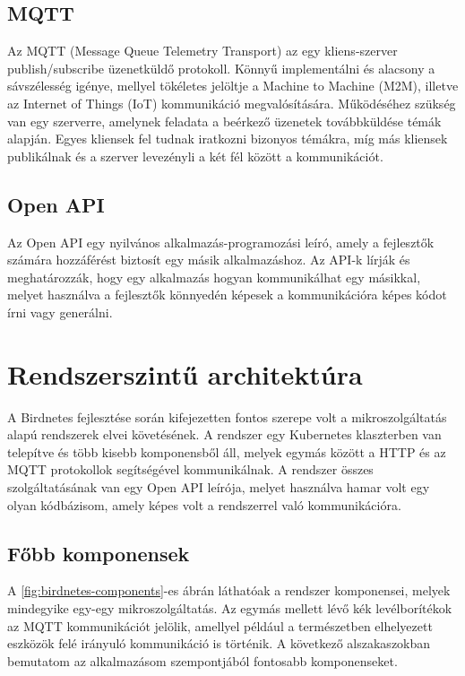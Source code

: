 \subsection{MQTT}
Az MQTT (Message Queue Telemetry Transport) az egy kliens-szerver publish/subscribe üzenetküldő protokoll. Könnyű implementálni és alacsony a sávszélesség igénye,
mellyel tökéletes jelöltje a Machine to Machine (M2M), illetve az Internet of Things (IoT) kommunikáció megvalósítására.
Működéséhez szükség van egy szerverre, amelynek feladata a beérkező üzenetek továbbküldése témák alapján. Egyes kliensek fel tudnak iratkozni bizonyos témákra, míg más kliensek publikálnak
és a szerver levezényli a két fél között a kommunikációt.

\subsection{Open API}
Az Open API egy nyilvános alkalmazás-programozási leíró, amely a fejlesztők számára hozzáférést biztosít egy másik alkalmazáshoz.
Az API-k lírják és meghatározzák, hogy egy alkalmazás hogyan kommunikálhat egy másikkal, 
melyet használva a fejlesztők könnyedén képesek a kommunikációra képes kódot írni vagy generálni.

\section{Rendszerszintű architektúra}
A Birdnetes fejlesztése során kifejezetten fontos szerepe volt a mikroszolgáltatás alapú rendszerek elvei követésének.
A rendszer egy Kubernetes klaszterben van telepítve és több kisebb komponensből áll, melyek egymás között a HTTP és az MQTT protokollok segítségével kommunikálnak.
A rendszer összes szolgáltatásának van egy Open API leírója, melyet használva hamar volt egy olyan kódbázisom, amely képes volt a rendszerrel való kommunikációra.


\subsection{Főbb komponensek}
A \ref{fig:birdnetes-components}-es ábrán láthatóak a rendszer komponensei, melyek mindegyike egy-egy mikroszolgáltatás.
Az egymás mellett lévő kék levélborítékok az MQTT kommunikációt jelölik,
amellyel például a természetben elhelyezett eszközök felé irányuló kommunikáció is történik.
A következő alszakaszokban bemutatom az alkalmazásom szempontjából fontosabb komponenseket.

